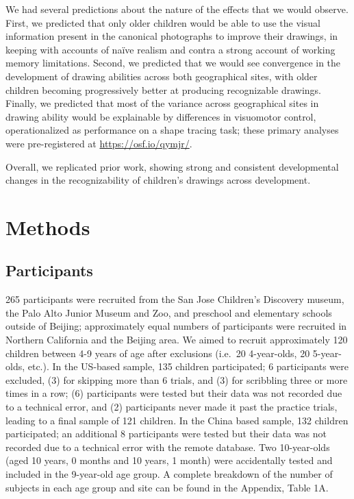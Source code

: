 \documentclass[
  english,
  man]{apa6}
\begin{document}
We had several predictions about the nature of the effects that we would observe. First, we predicted that only older children would be able to use the visual information present in the canonical photographs to improve their drawings, in keeping with accounts of naïve realism and contra a strong account of working memory limitations.
Second, we predicted that we would see convergence in the development of drawing abilities across both geographical sites, with older children becoming progressively better at producing recognizable drawings.
Finally, we predicted that most of the variance across geographical sites in drawing ability would be explainable by differences in visuomotor control, operationalized as performance on a shape tracing task; these primary analyses were pre-registered at \url{https://osf.io/qymjr/}.

Overall, we replicated prior work, showing strong and consistent developmental changes in the recognizability of children's drawings across development.

\hypertarget{methods}{%
\section{Methods}\label{methods}}

\hypertarget{participants}{%
\subsection{Participants}\label{participants}}

265 participants were recruited from the San Jose Children's Discovery museum, the Palo Alto Junior Museum and Zoo, and preschool and elementary schools outside of Beijing; approximately equal numbers of participants were recruited in Northern California and the Beijing area. We aimed to recruit approximately 120 children between 4-9 years of age after exclusions (i.e.~20 4-year-olds, 20 5-year-olds, etc.). In the US-based sample, 135 children participated; 6 participants were excluded, (3) for skipping more than 6 trials, and (3) for scribbling three or more times in a row; (6) participants were tested but their data was not recorded due to a technical error, and (2) participants never made it past the practice trials, leading to a final sample of 121 children. In the China based sample, 132 children participated; an additional 8 participants were tested but their data was not recorded due to a technical error with the remote database. Two 10-year-olds (aged 10 years, 0 months and 10 years, 1 month) were accidentally tested and included in the 9-year-old age group. A complete breakdown of the number of subjects in each age group and site can be found in the Appendix, Table 1A.
\end{document}

